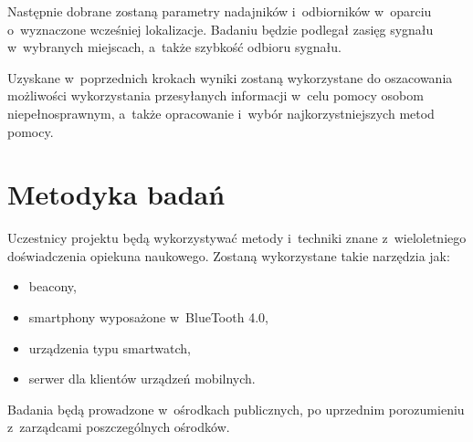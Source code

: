 \documentclass[a4paper]{article}
\begin{document}
Następnie dobrane zostaną parametry nadajników i~odbiorników w~oparciu o~wyznaczone wcześniej lokalizacje. Badaniu będzie podlegał zasięg sygnału w~wybranych miejscach, a~także szybkość odbioru sygnału. 

Uzyskane w~poprzednich krokach wyniki zostaną wykorzystane do oszacowania możliwości wykorzystania przesyłanych informacji w~celu pomocy osobom niepełnosprawnym, a~także opracowanie i~wybór najkorzystniejszych metod pomocy.

\section{Metodyka badań}
Uczestnicy projektu będą wykorzystywać metody i~techniki znane z~wieloletniego doświadczenia opiekuna naukowego. Zostaną wykorzystane takie narzędzia jak:
\begin{itemize}
\item beacony,
\item smartphony wyposażone w~BlueTooth 4.0,
\item urządzenia typu smartwatch,
\item serwer dla klientów urządzeń mobilnych.
\end{itemize} 

Badania będą prowadzone w~ośrodkach publicznych, po uprzednim porozumieniu z~zarządcami poszczególnych ośrodków.
\end{document}
